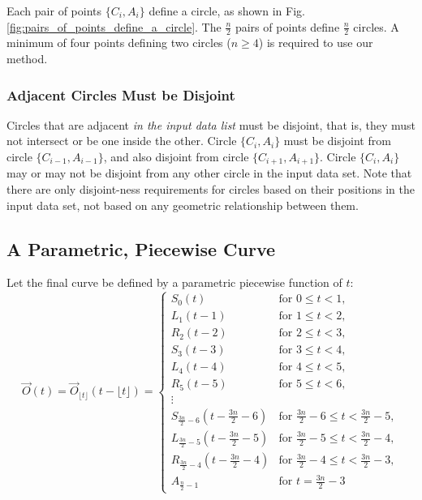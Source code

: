 \documentclass{article}
\begin{document}

Each pair of points \( \{C_i, A_i\} \) define a circle, as shown in Fig. \ref{fig:pairs_of_points_define_a_circle}. The \( \frac{n}{2} \) pairs of points define \( \frac{n}{2} \) circles. A minimum of four points defining two circles (\( n \geq 4 \)) is required to use our method.

\subsubsection{Adjacent Circles Must be Disjoint}
Circles that are adjacent \textit{in the input data list} must be disjoint, that is, they must not intersect or be one inside the other. Circle \( \{C_i, A_i\} \) must be disjoint from circle \( \{C_{i-1}, A_{i-1}\} \), and also disjoint from circle \( \{C_{i+1}, A_{i+1}\} \). Circle \( \{C_i, A_i\} \) may or may not be disjoint from any other circle in the input data set. Note that there are only disjoint-ness requirements for circles based on their positions in the input data set, not based on any geometric relationship between them.


\subsection{A Parametric, Piecewise Curve}
\label{subsec:definition_of_curve}
Let the final curve be defined by a parametric piecewise function of $t$:
\begin{equation}
    \label{eq:O(t)}
\overrightarrow{O}(t) = \overrightarrow{O}_{\lfloor t \rfloor}(t - \lfloor t \rfloor) = \begin{cases}
S_0(t) & \text{for } 0 \leq t < 1, \\
L_1(t - 1) & \text{for } 1 \leq t < 2, \\
R_2(t - 2) & \text{for } 2 \leq t < 3, \\
S_3(t - 3) & \text{for } 3 \leq t < 4, \\
L_4(t - 4) & \text{for } 4 \leq t < 5, \\
R_5(t - 5) & \text{for } 5 \leq t < 6, \\
\vdots & \\
S_{\frac{3n}{2}-6}(t - \frac{3n}{2}-6) & \text{for } \frac{3n}{2}-6 \leq t < \frac{3n}{2}-5, \\
L_{\frac{3n}{2}-5}(t - \frac{3n}{2}-5) & \text{for } \frac{3n}{2}-5 \leq t < \frac{3n}{2}-4, \\
R_{\frac{3n}{2}-4}(t - \frac{3n}{2}-4) & \text{for } \frac{3n}{2}-4 \leq t < \frac{3n}{2}-3, \\
A_{\frac{n}{2}-1} & \text{for } t = \frac{3n}{2}-3
\end{cases}
\end{equation}
\end{document}
